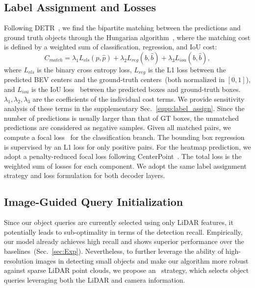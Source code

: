 \subsection{Label Assignment and Losses} 
\noindent Following DETR~\cite{misra20213detr}, we find the bipartite matching between {the} predictions and ground truth objects through {the} Hungarian algorithm~\cite{Kuhn1955TheHM}, where the matching cost is defined by a weighted sum of classification, regression, and IoU cost{:}
\begin{equation}
	C_{match} = \lambda_1 L_{cls}(p, \hat p) + \lambda_2 L_{reg}(b, \hat b) + \lambda_3 L_{iou}(b, \hat b),
	\label{eq:matching_cost}
\end{equation}
where $L_{cls}$ is the binary cross entropy loss, $L_{reg}$ is the L1 loss between {the} {predicted BEV centers and the ground-truth centers~(both normalized in $[0, 1]$),} 
and $L_{iou}$ is the IoU loss~\cite{Zhou2019IoULF} between {the} predicted boxes and ground-truth boxes. $\lambda_1, \lambda_2, \lambda_3$ are the coefficients of the individual cost terms. We provide sensitivity {analysis} of these terms in the supplementary Sec.~\ref{supp:label_assign}. Since the number of predictions is usually larger than that of GT boxes, the unmatched predictions are considered as negative samples.
Given all matched pairs, we compute {a} focal loss~\cite{Lin2017FocalLF} for the classification branch. The bounding box regression is supervised by {an} L1 loss for only positive pairs. For the heatmap prediction, we adopt a penalty-reduced focal loss following CenterPoint~\cite{Yin2020Centerbased3O}. The total loss is the weighted sum of losses for each component. We adopt the same label assignment strategy and loss formulation for both decoder layers.











\subsection{Image-Guided Query Initialization}
\label{subsubsec:img_query} 
{Since} our object queries are {currently} selected using only
LiDAR features, {it potentially leads to} sub-optimality in terms of the detection recall.
Empirically, our model already achieves high recall and shows superior performance over {the} baselines~(Sec.~\ref{sec:Exp}). Nevertheless, to further leverage the ability of high-resolution images 
{in detecting} {small} objects and make our algorithm more robust {against} sparse LiDAR point clouds, we propose an \secondmodule~strategy{,} which selects object queries leveraging both {the} LiDAR and camera information.
 
